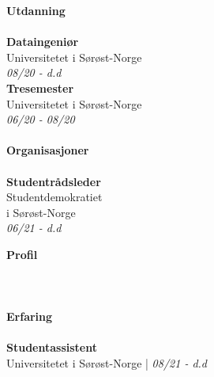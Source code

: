 \documentclass[a4paper, 12pt]{article}
\begin{document}
    \begin{minipage}{.5\textwidth}
    \end{minipage}
    \begin{minipage}{.5\textwidth}
    \end{minipage}

    \horizontalline{\linewidth}{1cm}

    \begin{minipage}[t]{0.3\textwidth}
        \Large\textbf{Utdanning}\\\\
        \normalsize\textbf{Dataingeniør}\\
        \small{Universitetet i Sørøst-Norge}\\
        \small \textit{08/20 - d.d} \\

        \normalsize\textbf{Tresemester}\\
        \small{Universitetet i Sørøst-Norge}\\
        \small \textit{06/20 - 08/20}\\\\
        \horizontalline{2.5cm}{0.4cm}
        \Large\textbf{Organisasjoner}\\\\
        \normalsize\textbf{Studentrådsleder}\\
        \small{Studentdemokratiet \\i Sørøst-Norge}\\
        \small{\textit{06/21 - d.d}}
    \end{minipage}
    \hfill\vline\hfill
    \begin{minipage}[t]{0.6\textwidth}
        \Large \textbf{Profil}\\\\
         \\\\
        \horizontalline{\linewidth}{0.4cm}
        \Large \textbf{Erfaring}\\\\
        \large\textbf{Studentassistent}\\
        \normalsize Universitetet i Sørøst-Norge | \small\textit{08/21 - d.d}\\
    \end{minipage}
\end{document}
